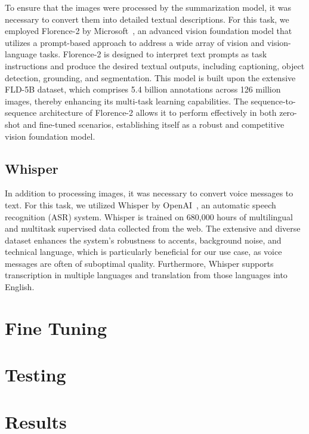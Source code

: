 \documentclass[10pt,twocolumn,letterpaper]{article}
\begin{document}
To ensure that the images were processed by the summarization model, it was necessary to convert them into detailed textual descriptions. 
For this task, we employed Florence-2 by Microsoft~\cite{xiao2023florence2advancingunifiedrepresentation}, an advanced vision foundation model that utilizes a prompt-based approach to address a wide array of vision and vision-language tasks. 
Florence-2 is designed to interpret text prompts as task instructions and produce the desired textual outputs, including captioning, object detection, grounding, and segmentation. 
This model is built upon the extensive FLD-5B dataset, which comprises 5.4 billion annotations across 126 million images, thereby enhancing its multi-task learning capabilities. 
The sequence-to-sequence architecture of Florence-2 allows it to perform effectively in both zero-shot and fine-tuned scenarios, establishing itself as a robust and competitive vision foundation model.

\subsection{Whisper}

In addition to processing images, it was necessary to convert voice messages to text. 
For this task, we utilized Whisper by OpenAI~\cite{radford2022robustspeechrecognitionlargescale}, an automatic speech recognition (ASR) system. 
Whisper is trained on 680,000 hours of multilingual and multitask supervised data collected from the web. 
The extensive and diverse dataset enhances the system's robustness to accents, background noise, and technical language, which is particularly beneficial for our use case, as voice messages are often of suboptimal quality. 
Furthermore, Whisper supports transcription in multiple languages and translation from those languages into English.

\section{Fine Tuning}

\section{Testing}

\section{Results}


\end{document}
